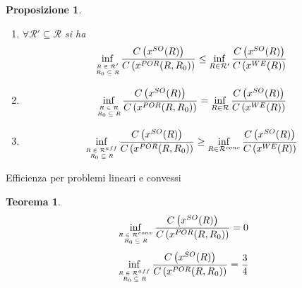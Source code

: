\documentclass{beamer}
\newcounter{counter1}
\theoremstyle{plain}
\newtheorem{myteo}[counter1]{Teorema}
\newtheorem{mypro}[counter1]{Proposizione}
\theoremstyle{definition}
\theoremstyle{remark}
\newcommand{\set}[1]{\left\{#1\right\}}
\newcommand{\pa}[1]{\left(#1\right)}
\begin{document}
\begin{frame}
  \begin{mypro}
    \begin{enumerate}
    \item $\forall \mathcal{R}' \subseteq \mathcal{R}$ si ha
        \[ \inf _{\tiny\begin{matrix}R\in \mathcal{R}'\\R_0\subseteq
              R\end{matrix}}
          \frac{C\pa{x^{SO}(R)}}{C\pa{x^{POR}(R,R_0)}} \le
          \inf _{R\in \mathcal{R}'}
          \frac{C\pa{x^{SO}(R)}}{C\pa{x^{WE}(R)}}
        \]
      \item
        \[ \inf _{\tiny\begin{matrix}R\in \mathcal{R}\\R_0\subseteq
              R\end{matrix}}
          \frac{C\pa{x^{SO}(R)}}{C\pa{x^{POR}(R,R_0)}} =
          \inf _{R\in \mathcal{R}}
          \frac{C\pa{x^{SO}(R)}}{C\pa{x^{WE}(R)}}
        \]
      \item
        \[ \inf _{\tiny\begin{matrix}R\in \mathcal{R}^{aff}\\R_0\subseteq
              R\end{matrix}}
          \frac{C\pa{x^{SO}(R)}}{C\pa{x^{POR}(R,R_0)}} \ge
          \inf _{R\in \mathcal{R}^{conc}}
          \frac{C\pa{x^{SO}(R)}}{C\pa{x^{WE}(R)}}
        \]
    \end{enumerate}
  \end{mypro}
\end{frame}

\begin{frame}{Efficienza per problemi lineari e convessi}
  \begin{myteo}
  \[ \inf _{\tiny\begin{matrix}R\in \mathcal{R}^{conv}\\R_0\subseteq
        R\end{matrix}}
    \frac{C\pa{x^{SO}(R)}}{C\pa{x^{POR}(R,R_0)}} = 0\]    
  \[ \inf _{\tiny\begin{matrix}R\in \mathcal{R}^{aff}\\R_0\subseteq
        R\end{matrix}}
    \frac{C\pa{x^{SO}(R)}}{C\pa{x^{POR}(R,R_0)}} = \frac{3}{4} \]    
  \end{myteo}
\end{frame}
\end{document}
